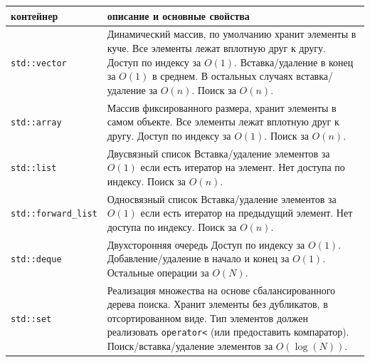 \documentclass{article}
\begin{document}
\begin{center}
\bgroup
\def\arraystretch{2}%
\begin{tabular}{ p{3.3cm} | p{14cm} }
контейнер & описание и основные свойства \\ \hline

\texttt{std::vector} & 
Динамический массив, по умолчанию хранит элементы в куче. \newline 
Все элементы лежат вплотную друг к другу. \newline 
Доступ по индексу за $O(1)$. Вставка/удаление в конец за $O(1)$ в среднем. \newline
В остальных случаях вставка/удаление за $O(n)$. Поиск за $O(n)$.  \newline 
\\ \hline

\texttt{std::array} &
Массив фиксированного размера, хранит элементы в самом объекте. \newline 
Все элементы лежат вплотную друг к другу. \newline 
Доступ по индексу за $O(1)$. Поиск за $O(n)$. \newline 
\\ \hline

\texttt{std::list} &
Двусвязный список \newline 
Вставка/удаление элементов за $O(1)$ если есть итератор на элемент. \newline 
Нет доступа по индексу. Поиск за $O(n)$. \newline 
\\ \hline


\texttt{std::forward\_list} &
Односвязный список \newline 
Вставка/удаление элементов за $O(1)$ если есть итератор на предыдущий элемент. \newline 
Нет доступа по индексу. Поиск за $O(n)$. \newline 
\\ \hline


\texttt{std::deque} &
Двухсторонняя очередь \newline 
Доступ по индексу за $O(1)$. Добавление/удаление в начало и конец за $O(1)$. \newline 
Остальные операции за $O(N)$. \newline 
\\ \hline

\texttt{std::set} &
Реализация множества на основе сбалансированного дерева поиска. \newline 
Хранит элементы без дубликатов, в отсортированном виде. \newline 
Тип элементов должен реализовать \texttt{operator<} (или предоставить компаратор). \newline 
Поиск/вставка/удаление элементов за $O(\log(N))$. \newline 
\\ \hline



\end{tabular}
\end{center}
\end{document}
